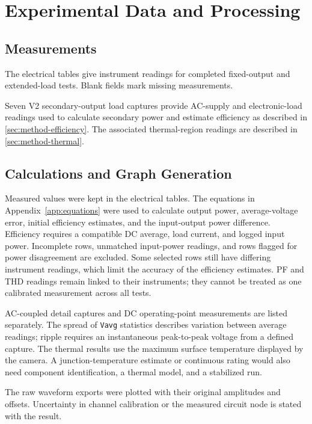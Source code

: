 \chapter{Experimental Data and Processing}
\label{app:data}

\section{Measurements}

The electrical tables give instrument readings for completed fixed-output and extended-load tests. Blank fields mark missing measurements.

Seven V2 secondary-output load captures provide AC-supply and electronic-load readings used to calculate secondary power and estimate efficiency as described in \cref{sec:method-efficiency}. The associated thermal-region readings are described in \cref{sec:method-thermal}.

\section{Calculations and Graph Generation}

Measured values were kept in the electrical tables. The equations in
Appendix~\ref{app:equations} were used to calculate output power,
average-voltage error, initial efficiency estimates, and the input-output power
difference. Efficiency requires a compatible DC average, load current,
and logged input power. Incomplete rows, unmatched input-power readings,
and rows flagged for power disagreement are excluded. Some selected rows
still have differing instrument readings, which limit the accuracy of the
efficiency estimates. PF and THD readings remain linked to their instruments;
they cannot be treated as one calibrated measurement across all tests.

AC-coupled detail captures and DC operating-point measurements are listed separately. The spread of \texttt{Vavg} statistics describes variation between average readings; ripple requires an instantaneous peak-to-peak voltage from a defined capture. The thermal results use the maximum surface temperature displayed by the camera. A junction-temperature estimate or continuous rating would also need component identification, a thermal model, and a stabilized run.

The raw waveform exports were plotted with their original amplitudes
and offsets. Uncertainty in channel calibration or the measured circuit
node is stated with the result. 

